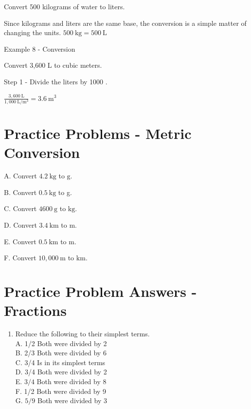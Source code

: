 \documentclass[10pt]{article}
\begin{document}
Convert 500 kilograms of water to liters.

Since kilograms and liters are the same base, the conversion is a simple matter of changing the units. $500 \mathrm{~kg}=500 \mathrm{~L}$

Example 8 - Conversion

Convert 3,600 L to cubic meters.

Step 1 - Divide the liters by 1000 .

$\frac{3,600 \mathrm{~L}}{1,000 \mathrm{~L} / \mathrm{m}^{3}}=3.6 \mathrm{~m}^{3}$

\section{Practice Problems - Metric Conversion}
A. Convert $4.2 \mathrm{~kg}$ to $\mathrm{g}$.

B. Convert $0.5 \mathrm{~kg}$ to g.

C. Convert $4600 \mathrm{~g}$ to $\mathrm{kg}$.

D. Convert $3.4 \mathrm{~km}$ to $\mathrm{m}$.

E. Convert $0.5 \mathrm{~km}$ to $\mathrm{m}$.

F. Convert $10,000 \mathrm{~m}$ to $\mathrm{km}$.

\section{Practice Problem Answers - Fractions}
\begin{enumerate}
  \item Reduce the following to their simplest terms.\\
A. 1/2 Both were divided by 2\\
B. 2/3 Both were divided by 6\\
C. 3/4 Is in its simplest terms\\
D. 3/4 Both were divided by 2\\
E. $3 / 4$ Both were divided by 8\\
F. 1/2 Both were divided by 9\\
G. $5 / 9$ Both were divided by 3
\end{enumerate}
\end{document}
